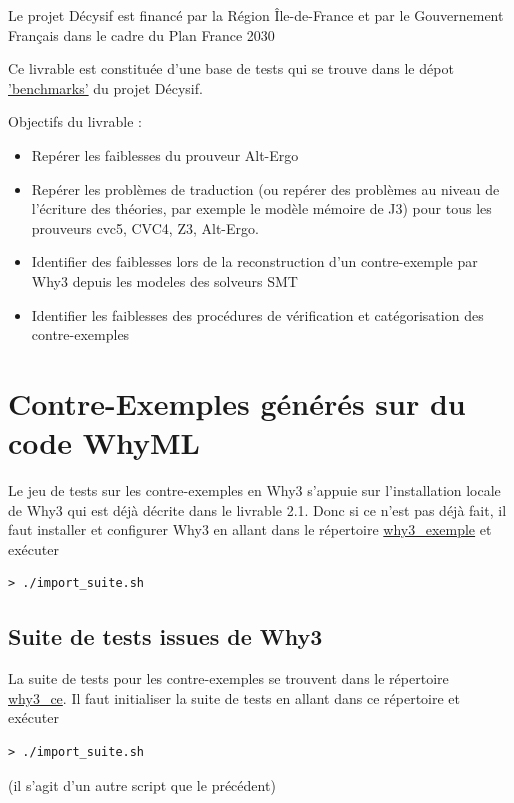 \documentclass[a4paper,11pt]{article}
\begin{document}
\noindent Le projet Décysif est financé par la Région Île-de-France et par le Gouvernement
Français dans le cadre du Plan France 2030

\clearpage

Ce livrable est constituée d'une base de tests qui se trouve dans le dépot
\href{https://github.com/Decysif/benchmarks}{'benchmarks'} du projet Décysif.

Objectifs du livrable :

\begin{itemize}
\item Repérer les faiblesses du prouveur Alt-Ergo
\item Repérer les problèmes de traduction (ou repérer des problèmes au
  niveau de l'écriture des théories, par exemple le modèle mémoire de
  J3) pour tous les prouveurs cvc5, CVC4, Z3, Alt-Ergo.
\item Identifier des faiblesses lors de la reconstruction d'un
  contre-exemple par Why3 depuis les modeles des solveurs
  SMT~\cite{dailler18jlamp}
\item Identifier les faiblesses des procédures de vérification et
  catégorisation des contre-exemples~\cite{becker21rr,becker21fide}
\end{itemize}



\section{Contre-Exemples générés sur du code  WhyML}

Le jeu de tests sur les contre-exemples en Why3 s'appuie sur
l'installation locale de Why3 qui est déjà décrite dans le livrable
2.1. Donc si ce n'est pas déjà fait, il faut installer et configurer Why3 en allant dans le répertoire \url{why3_exemple} et exécuter
\begin{lstlisting}
> ./import_suite.sh
\end{lstlisting}

\subsection{Suite de tests issues de Why3}

La suite de tests pour les contre-exemples se trouvent dans le
répertoire \url{why3_ce}. Il faut initialiser la suite de tests en
allant dans ce répertoire et exécuter
\begin{lstlisting}
> ./import_suite.sh
\end{lstlisting}
(il s'agit d'un autre script que le précédent)
\end{document}
